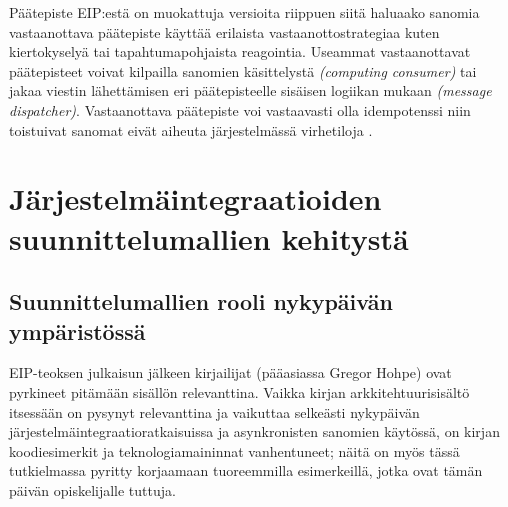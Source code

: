       Päätepiste EIP:estä on muokattuja versioita riippuen siitä haluaako sanomia vastaanottava päätepiste käyttää erilaista vastaanottostrategiaa kuten kiertokyselyä tai tapahtumapohjaista reagointia. Useammat vastaanottavat päätepisteet voivat kilpailla sanomien käsittelystä \textit{(computing consumer)} tai jakaa viestin lähettämisen eri päätepisteelle sisäisen logiikan mukaan \textit{(message dispatcher)}. Vastaanottava päätepiste voi vastaavasti olla idempotenssi niin toistuivat sanomat eivät aiheuta järjestelmässä virhetiloja \citep[sivu~106]{Hohpe2004}.




      \chapter{Järjestelmäintegraatioiden suunnittelumallien kehitystä} \label{chap:kehitystä}

\section{Suunnittelumallien rooli nykypäivän ympäristössä}
   EIP-teoksen \citep{Hohpe2004} julkaisun jälkeen kirjailijat (pääasiassa Gregor Hohpe) ovat pyrkineet pitämään sisällön relevanttina. Vaikka kirjan arkkitehtuurisisältö itsessään on pysynyt relevanttina ja vaikuttaa selkeästi nykypäivän järjestelmäintegraatioratkaisuissa ja asynkronisten sanomien käytössä, on kirjan koodiesimerkit ja teknologiamaininnat vanhentuneet; näitä on myös tässä tutkielmassa pyritty korjaamaan tuoreemmilla esimerkeillä, jotka ovat tämän päivän opiskelijalle tuttuja. 


